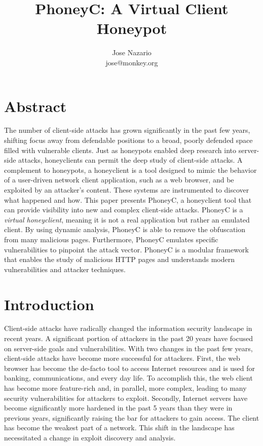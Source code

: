 \documentclass[10pt,twocolumn]{article}
\begin{document}
\title{PhoneyC: A Virtual Client Honeypot}

\author{Jose Nazario\\jose@monkey.org}

\maketitle

\section*{Abstract}

The number of client-side attacks has grown significantly in the past few years, shifting focus away from defendable positions to a broad, poorly defended space filled with vulnerable clients. Just as honeypots enabled deep research into server-side attacks, honeyclients can permit the deep study of client-side attacks. A complement to honeypots, a honeyclient is a tool designed to mimic the behavior of a user-driven network client application, such as a web browser, and be exploited by an attacker's content. These systems are instrumented to discover what happened and how. This paper presents PhoneyC, a honeyclient tool that can provide visibility into new and complex client-side attacks. PhoneyC is a {\em virtual honeyclient}, meaning it is not a real application but rather an emulated client. By using dynamic analysis, PhoneyC is able to remove the obfuscation from many malicious pages. Furthermore, PhoneyC emulates specific vulnerabilities to pinpoint the attack vector. PhoneyC is a modular framework that enables the study of malicious HTTP pages and understands modern vulnerabilities and attacker techniques. 

\section{Introduction}
\label{intro}

Client-side attacks have radically changed the information security landscape in recent years. A significant portion of attackers in the past 20 years have focused on server-side goals and vulnerabilities. With two changes in the past few years, client-side attacks have become more successful for attackers. First, the web browser has become the de-facto tool to access Internet resources and is used for banking, communications, and every day life. To accomplish this, the web client has become more feature-rich and, in parallel, more complex, leading to many security vulnerabilities for attackers to exploit. Secondly, Internet servers have become significantly more hardened in the past 5 years than they were in previous years, significantly raising the bar for attackers to gain access. The client has become the weakest part of a network. This shift in the landscape has necessitated a change in exploit discovery and analysis.
\end{document}
